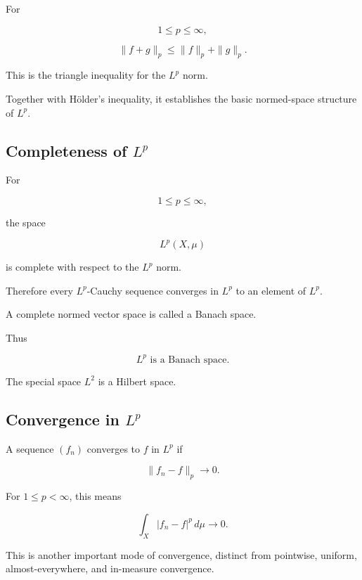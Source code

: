 \begin{theorem}
For

\[
1\leq p\leq\infty,
\]

\[
\boxed{
\|f+g\|_p
\leq
\|f\|_p+\|g\|_p.
}
\]
\end{theorem}

This is the triangle inequality for the \(L^p\) norm.

Together with H\"older's inequality, it establishes the basic normed-space
structure of \(L^p\).

\subsection{Completeness of \(L^p\)}
\label{subsec:completeness-lp}

\begin{theorem}
For

\[
1\leq p\leq\infty,
\]

the space

\[
\boxed{
L^p(X,\mu)
}
\]

is complete with respect to the \(L^p\) norm.
\end{theorem}

Therefore every \(L^p\)-Cauchy sequence converges in \(L^p\) to an element
of \(L^p\).

A complete normed vector space is called a Banach space.

Thus

\[
\boxed{
L^p
\text{ is a Banach space}.
}
\]

The special space \(L^2\) is a Hilbert space.

\subsection{Convergence in \(L^p\)}
\label{subsec:lp-convergence}

A sequence \((f_n)\) converges to \(f\) in \(L^p\) if

\[
\boxed{
\|f_n-f\|_p\to0.
}
\]

For \(1\leq p<\infty\), this means

\[
\boxed{
\int_X|f_n-f|^p\,d\mu\to0.
}
\]

This is another important mode of convergence, distinct from pointwise,
uniform, almost-everywhere, and in-measure convergence.

